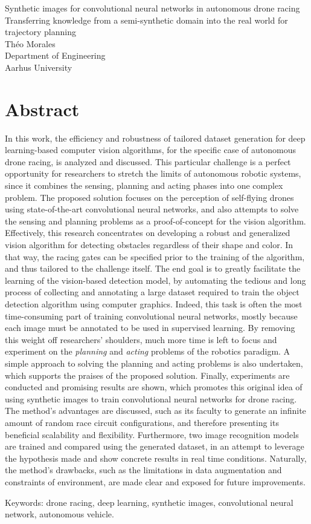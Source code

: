 Synthetic images for convolutional neural networks in autonomous
drone racing \\
Transferring knowledge from a semi-synthetic domain into the real world for
trajectory planning\\
Théo Morales\\
Department of Engineering\\
Aarhus University \setlength{\parskip}{0.5cm}

\thispagestyle{plain}			%
\setlength{\parskip}{0pt plus 1.0pt}
\section*{Abstract}

In this work, the efficiency and robustness of tailored dataset generation for
deep learning-based computer vision algorithms, for the specific case of
autonomous drone racing, is analyzed and discussed. This particular challenge
is a perfect opportunity for researchers to stretch the limits of autonomous
robotic systems, since it combines the sensing, planning and acting phases into
one complex problem. The proposed solution focuses on the perception of self-flying
drones using state-of-the-art convolutional neural networks, and also attempts
to solve the sensing and planning problems as a proof-of-concept for the vision
algorithm. Effectively,
this research concentrates on developing a robust and generalized vision
algorithm for detecting obstacles regardless of their shape and color. In that
way, the racing gates can be specified prior to the training of the algorithm,
and thus tailored to the challenge itself. The end goal is to greatly
facilitate the learning of the vision-based detection model, by automating the
tedious and long process of collecting and annotating a large dataset required
to train the object detection algorithm using computer graphics. Indeed, this task
is often the most time-consuming part of training convolutional neural
networks, mostly because each image must be annotated to be used in supervised
learning. By removing this weight off researchers' shoulders, much more time is
left to focus and experiment on the \emph{planning} and \emph{acting} problems
of the robotics paradigm. A simple approach to solving the planning and acting
problems is also undertaken, which supports the praises of the proposed
solution. Finally, experiments are conducted and promising results are shown,
which promotes this original idea of using synthetic images to
train convolutional neural networks for drone racing. The method's advantages
are discussed, such as its faculty to generate an infinite amount of random
race circuit configurations, and therefore presenting its beneficial
scalability and flexibility. Furthermore, two image recognition models are
trained and compared using the generated dataset, in an attempt to leverage the
hypothesis made and show concrete results in real time conditions.
Naturally, the method's drawbacks, such as the limitations in data augmentation
and constraints of environment, are made clear and exposed for future
improvements.

\vfill
Keywords: drone racing, deep learning, synthetic images, convolutional neural
network, autonomous vehicle.

